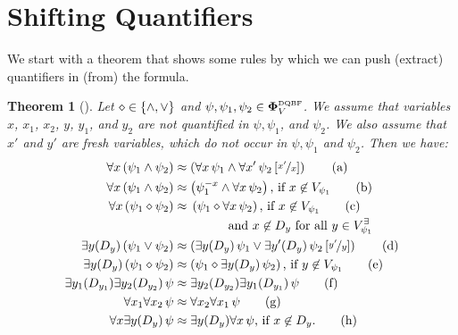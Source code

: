 \documentclass[
  digital, %
  color,
  twoside, %
  table,   %
  nolof,     %
  nolot,     %
]{fithesis3}
\let\setbuilder\set
\newcommand{\simpleset}[1]{\{{#1}\}}
\renewcommand{\set}[1]{\normalexpandarg\IfSubStr{#1}{|}{\setbuilder{#1}}{\simpleset{#1}}}
\newtheorem{theorem}{Theorem}[chapter] %
\theoremstyle{definition}
\theoremstyle{remark}
\newcommand{\substitute}[2]{\left[ \nicefrac{#2}{#1} \right]}
\newcommand{\DQBF}[1]{\mathbf{\Phi}_{#1}^{\normalfont{\text{\tiny DQBF}}}}
\newcommand{\evars}[1]{V_{#1}^{\exists}}
\newcommand{\itholds}{\,}
\begin{document}
\section{Shifting Quantifiers}
\label{sec:quantLocalisation}
We start with a theorem that shows some rules by which we can push (extract) quantifiers in (from) the formula. 

\begin{theorem}[{\cite[Theorems 3,4]{HQSquantifierLocalisation}}]
\label{thrm:quantLocalEq}
  Let ${\diamond} \in \set{{\land},{\lor}}$ and $\psi,\psi_1,\psi_2 \in \DQBF{V}$. We assume that variables $x$, $x_1$, $x_2$, $y$, $y_1$, and $y_2$ are not quantified in $\psi, \psi_1$, and $\psi_2$. We also assume that $x'$ and $y'$ are fresh variables, which do not occur in $\psi,\psi_1$ and $\psi_2$. Then we have:
  \begin{align}
      \forall x \itholds (\psi_1 \land \psi_2) &\approx \left(\forall x \itholds \psi_1 \land \forall x' \itholds \psi_2\substitute{x}{x'}\right) \tag{a} \label{loc:unconj1} \\
      \forall x \itholds (\psi_1 \land \psi_2) &\approx \left(\psi_1^{-x} \land \forall x \itholds \psi_2\right) \text{, if } x \not\in V_{\psi_1} \tag{b} \label{loc:unconj2} \\
      \forall x \itholds (\psi_1 \diamond \psi_2) &\approx \begin{multlined}[t][3cm]\left(\psi_1 \diamond \forall x \itholds \psi_2\right) \text{, if } x \not\in V_{\psi_1} \tag{c} \label{loc:undisj} \\
      \text{ and } x \not\in D_y \text{ for all } y \in \evars{\psi_1}\end{multlined} \\
      \exists y(D_y) \itholds (\psi_1 \lor \psi_2) &\approx \left(\exists y(D_y) \itholds \psi_1 \lor \exists y'(D_y) \itholds \psi_2\substitute{y}{y'}\right) \tag{d} \label{loc:exdisj} \\
      \exists y(D_y) \itholds (\psi_1 \diamond \psi_2) &\approx \left(\psi_1 \diamond \exists y(D_y) \itholds \psi_2\right) \text{, if } y \not\in V_{\psi_1} \tag{e} \label{loc:exboth} \\
      \exists y_1(D_{y_1})\exists y_2(D_{y_2}) \itholds \psi &\approx \exists y_2(D_{y_2}) \exists y_1(D_{y_1}) \itholds \psi \tag{f} \label{loc:exswap} \\
      \forall x_1\forall x_2 \itholds \psi &\approx \forall x_2\forall x_1 \itholds \psi \tag{g} \label{loc:unswap} \\
      \forall x\exists y(D_y) \itholds \psi &\approx \exists y(D_y)\forall x \itholds \psi\text{, if } x \not\in D_y. \tag{h} \label{loc:bothswap}
  \end{align}
\end{theorem}
\end{document}
